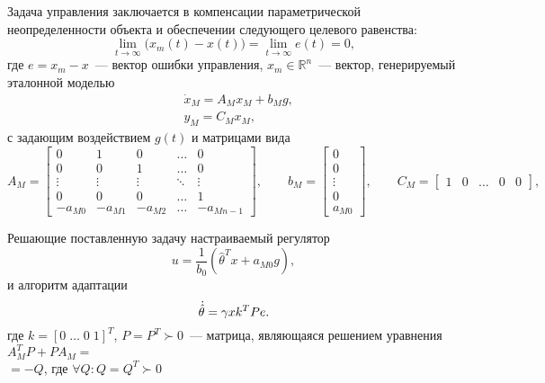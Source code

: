 Задача управления заключается в компенсации параметрической неопределенности объекта и обеспечении следующего целевого равенства:
\begin{equation}\label{eq_goal_of_control}
    \lim_{t \rightarrow \infty} \bigl( x_m(t) - x(t) \bigr) = \lim_{t \rightarrow \infty} e(t) = 0,
\end{equation}
где $e = x_m - x$~--- вектор ошибки управления, $x_m \in \mathbb{R}^n$~--- вектор, генерируемый эталонной моделью
\begin{equation}
    \begin{aligned}
        & \dot{x}_M = A_M x_M + b_M g, \\
        & y_M = C_M x_M,
    \end{aligned}
\end{equation}
с задающим воздействием $g(t)$ и матрицами вида
\begin{equation}
    A_M =
    \begin{bmatrix}
        0 & 1 & 0 & \ldots & 0 \\
        0 & 0 & 1 & \ldots & 0 \\
        \vdots & \vdots & \vdots & \ddots & \vdots \\
        0 & 0 & 0 & \ldots & 1 \\
        -a_{M0} & -a_{M1} & -a_{M2} & \ldots & -a_{Mn-1}
    \end{bmatrix}\!\!,
    \qquad
    b_M =
    \begin{bmatrix}
        0 \\ 0 \\ \vdots \\ 0 \\ a_{M0}
    \end{bmatrix}\!\!,
    \qquad
    C_M =
    \begin{bmatrix}
        1 & 0 & \ldots & 0 & 0
    \end{bmatrix}\!\!,
\end{equation}

Решающие поставленную задачу настраиваемый регулятор
\begin{equation}\label{eq_tuned_controller}
    u = \frac{1}{b_0} (\hat\theta^T x + a_{M0} g),
\end{equation}
и алгоритм адаптации
\begin{equation}\label{eq_AA}
    \dot{\hat{\theta}} = \gamma x k^T P e \ldotp
\end{equation}
где $k = [0\;\ldots\;0\;1]^T$, $P=P^T \succ 0$~--- матрица, являющаяся решением уравнения $A^T_M P + P A_M =$\\ $=-Q$, где $\forall Q : Q=Q^T \succ 0$


